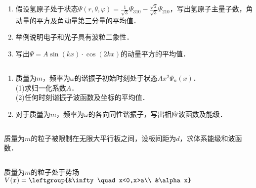 
\subsection{ }
\begin{enumerate}
\item 假设氢原子处于状态$\Psi (r,\theta,\varphi)=\frac{1}{\sqrt{3}}\Psi_{310}-\frac{\sqrt{2}}{\sqrt{3}}\Psi_{210}$，写出氢原子主量子数，角动量的平方及角动量第三分量的平均值．
\item 举例说明电子和光子具有波粒二象性．
\item 写出$\Psi = A \sin(kx)\cdot\cos(2kx)$的动量平方的平均值．
\end{enumerate}
\subsection{ }
\begin{enumerate}
\item 质量为$m$，频率为$\omega$的谐振子初始时刻处于状态$Ax^2\Psi_n(x)$．\\
(1)求归一化系数$A$．\\
(2)任何时刻谐振子波函数及坐标的平均值．
\item 对于质量为$m$，频率为$\omega$的各向同性谐振子，写出相应波函数及能级．
\end{enumerate}
\subsection{ }
质量为$m$的粒子被限制在无限大平行板之间，设板间距为$d$，求体系能级和波函数．
\subsection{ }
质量为$m$的粒子处于势场$V(x)=\leftgroup{&\infty \quad x<0,x>a\\ &\alpha x} $